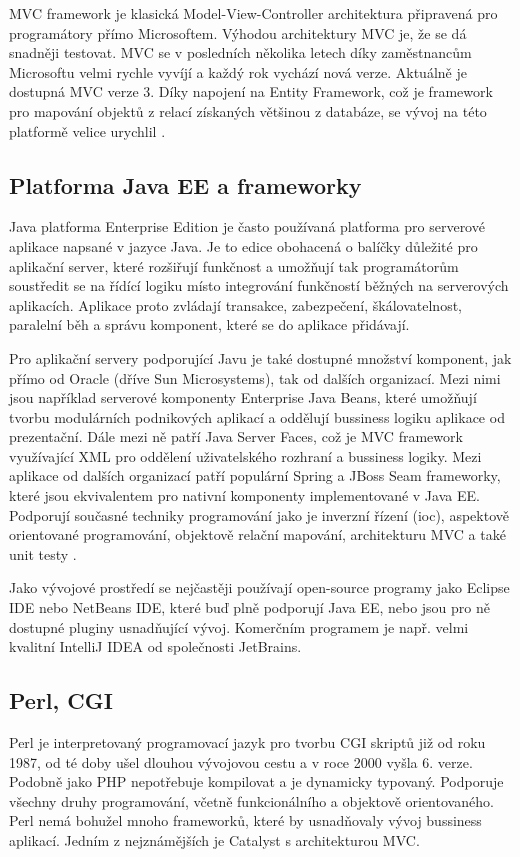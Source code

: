\documentclass[11pt,twoside,a4paper]{book}
\begin{document}
MVC framework je klasická Model-View-Controller architektura připravená pro programátory přímo Microsoftem. Výhodou architektury MVC je, že se dá snadněji testovat. MVC se v posledních několika letech díky zaměstnancům Microsoftu velmi rychle vyvíjí a každý rok vychází nová verze. Aktuálně je dostupná MVC verze 3. Díky napojení na Entity Framework, což je framework pro mapování objektů z relací získaných většinou z databáze, se vývoj na této platformě velice urychlil \cite{asp_net_mvc}.

\subsection{Platforma Java EE a frameworky}
Java platforma Enterprise Edition je často používaná platforma pro serverové aplikace napsané v jazyce Java. Je to edice obohacená o balíčky důležité pro aplikační server, které rozšiřují funkčnost a umožňují tak programátorům soustředit se na řídící logiku místo integrování funkčností běžných na serverových aplikacích. Aplikace proto zvládají transakce, zabezpečení, škálovatelnost, paralelní běh a správu komponent, které se do aplikace přidávají.

Pro aplikační servery podporující Javu je také dostupné množství komponent, jak přímo od Oracle (dříve Sun Microsystems), tak od dalších organizací. Mezi nimi jsou například serverové komponenty Enterprise Java Beans, které umožňují tvorbu modulárních podnikových aplikací a oddělují bussiness logiku aplikace od prezentační. Dále mezi ně patří Java Server Faces, což je MVC framework využívající XML pro oddělení uživatelského rozhraní a bussiness logiky. Mezi aplikace od dalších organizací patří populární Spring a JBoss Seam frameworky, které jsou ekvivalentem pro nativní komponenty implementované v Java EE. Podporují současné techniky programování jako je inverzní řízení (ioc), aspektově orientované programování, objektově relační mapování, architekturu MVC a také unit testy \cite{javaweb}\cite{wiki:frameworks}.

Jako vývojové prostředí se nejčastěji používají open-source programy jako Eclipse IDE nebo NetBeans IDE, které buď plně podporují Java EE, nebo jsou pro ně dostupné pluginy usnadňující vývoj. Komerčním programem je např. velmi kvalitní IntelliJ IDEA od společnosti JetBrains\cite{wiki:ide}.


\subsection{Perl, CGI}
Perl je interpretovaný programovací jazyk pro tvorbu CGI skriptů již od roku 1987, od té doby ušel dlouhou vývojovou cestu a v roce 2000 vyšla 6. verze. Podobně jako PHP nepotřebuje kompilovat a je dynamicky typovaný. Podporuje všechny druhy programování, včetně funkcionálního a objektově orientovaného\cite{wiki:perl}. Perl nemá bohužel mnoho frameworků, které by usnadňovaly vývoj bussiness aplikací. Jedním z nejznámějších je Catalyst s architekturou MVC.
\end{document}
